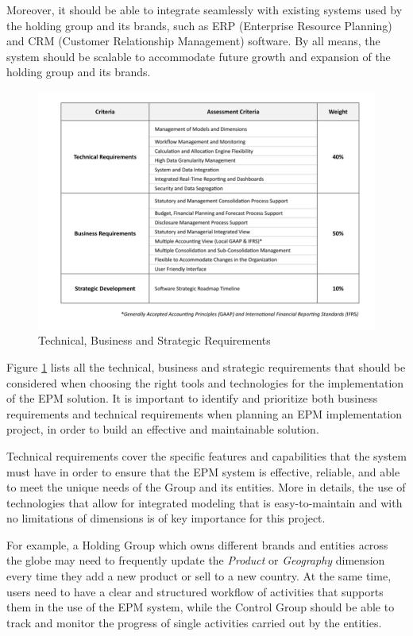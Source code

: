 \documentclass[12pt,a4paper,openright,twoside]{book}
\begin{document}
Moreover, it should be able to integrate seamlessly with existing systems used by the holding group and its brands, such as ERP (Enterprise Resource Planning) and CRM (Customer Relationship Management) software.
%
By all means, the system should be scalable to accommodate future growth and expansion of the holding group and its brands.

\begin{figure}[ht]
	\centering
	\includegraphics[width=\linewidth]{figures/requirements.pdf}
	\caption{Technical, Business and Strategic Requirements}
	\label{fig:requirements}
\end{figure}

Figure \ref{fig:requirements} lists all the technical, business and strategic requirements that should be considered when choosing the right tools and technologies for the implementation of the EPM solution.
%
It is important to identify and prioritize both business requirements and technical requirements when planning an EPM implementation project, in order to build an effective and maintainable solution.

Technical requirements cover the specific features and capabilities that the system must have in order to ensure that the EPM system is effective, reliable, and able to meet the unique needs of the Group and its entities.
%
More in details, the use of technologies that allow for integrated modeling that is easy-to-maintain and with no limitations of dimensions is of key importance for this project.

For example, a Holding Group which owns different brands and entities across the globe may need to frequently update the \textit{Product} or \textit{Geography} dimension every time they add a new product or sell to a new country.
%
At the same time, users need to have a clear and structured workflow of activities that supports them in the use of the EPM system, while the Control Group should be able to track and monitor the progress of single activities carried out by the entities.
\end{document}

